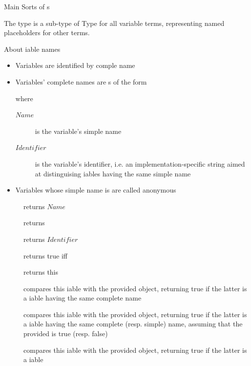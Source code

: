 \documentclass[handout]{beamer}
\begin{document}
\begin{frame}[allowframebreaks]{Main Sorts of s}
    \framebreak

    \begin{block}{The  type is a sub-type of }\centering
        Type for all variable terms, representing \alert{named} placeholders for other terms.
    \end{block}
    \begin{alertblock}{About iable names}
        \begin{itemize}
            \item Variables are identified by \alert{comple name}
            \item Variables' complete names are s of the form
            \begin{center}
            \end{center}
            where
            \begin{description}
                \item[$Name$] is the variable's \alert{simple} name
                \item[$Identifier$] is the variable's \alert{identifier}, i.e. an im\-ple\-men\-ta\-tion-spe\-ci\-fic string aimed at distinguising iables having the same simple name
            \end{description}
            \item Variables whose simple name is  are called \alert{anonymous}
        \end{itemize}
    \end{alertblock}
    \begin{description}
        \item[] returns $Name$
        \item[] returns 
        \item[] returns $Identifier$
        \item[] returns true iff 
        \item[] returns this 
        \item[] compares this iable with the provided object, returning true if the latter is a iable having the same complete name
        \item[] compares this iable with the provided object, returning true if the latter is a iable having the same complete (resp. simple) name, assuming that the provided  is true (resp. false)
        \item[] compares this iable with the provided object, returning true if the latter is a iable
    \end{description}


\end{frame}
\end{document}

